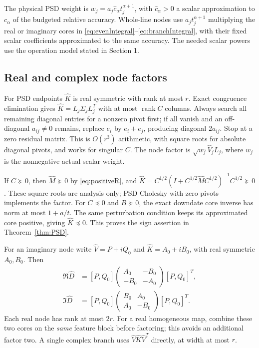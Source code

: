 \documentclass[11pt]{article}
\numberwithin{equation}{section}
\newcommand{\rank}{\operatorname{rank}}
\begin{document}
The physical PSD weight is
$w_j=a_j\widehat c_\alpha t_j^{\alpha+1}$, with
$\widehat c_\alpha>0$ a scalar approximation to $c_\alpha$ of the
budgeted relative accuracy. Whole-line nodes use
$a_jt_j^{\alpha+1}$ multiplying the real or imaginary cores in
\eqref{eq:evenIntegral}--\eqref{eq:branchIntegral}, with their fixed
scalar coefficients approximated to the same accuracy. The needed
scalar powers use the operation model stated in Section 1.

\subsection*{Real and complex node factors}
For PSD endpoints $\widehat K$ is real symmetric with rank at most $r$.
Exact congruence elimination gives
$\widehat K=L_j\Sigma_jL_j^T$ with at most $\rank C$ columns.
Always search all remaining diagonal entries for a nonzero pivot first;
if all vanish and an off-diagonal $a_{ij}\ne0$ remains, replace
$e_i$ by $e_i+e_j$, producing diagonal $2a_{ij}$. Stop at a zero
residual matrix. This is $O(r^3)$ arithmetic, with square roots for
absolute diagonal pivots, and works for singular $C$.
The node factor is $\sqrt{w_j}\widehat V_jL_j$, where
$w_j$ is the nonnegative actual scalar weight.

If $C\succeq0$, then $\widehat M\succeq0$ by
\eqref{eq:positiveR}, and
$\widehat K=C^{1/2}(I+C^{1/2}\widehat MC^{1/2})^{-1}C^{1/2}\succeq0$.
These square roots are analysis only; PSD Cholesky with zero pivots
implements the factor. For $C\preceq0$ and $B\succeq0$, the exact
downdate core inverse has norm at most $1+a/t$. The same perturbation
condition keeps its approximated core positive, giving
$\widehat K\preceq0$. This proves the sign assertion in
Theorem~\ref{thm:PSD}.

For an imaginary node write $\widehat V=P+iQ_0$ and
$\widehat K=A_0+iB_0$, with real symmetric $A_0,B_0$. Then
\begin{align*}
 \Re\widehat D&=[P,Q_0]
       \begin{pmatrix}A_0&-B_0\\-B_0&-A_0\end{pmatrix}[P,Q_0]^T,\\
 \Im\widehat D&=[P,Q_0]
       \begin{pmatrix}B_0&A_0\\A_0&-B_0\end{pmatrix}[P,Q_0]^T.
\end{align*}
Each real node has rank at most $2r$. For a real homogeneous map,
combine these two cores on the \emph{same} feature block before
factoring; this avoids an additional factor two. A single complex
branch uses $\widehat V\widehat K\widehat V^T$ directly, at width
at most $r$.
\end{document}
